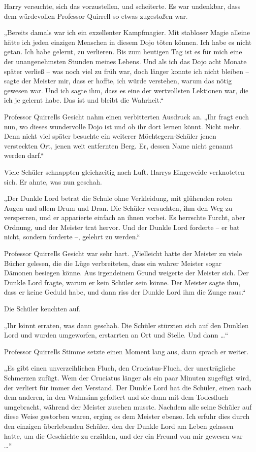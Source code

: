 {Harry versuchte, sich das vorzustellen, und scheiterte. Es war undenkbar, dass dem würdevollen Professor Quirrell so etwas zugestoßen war.

„Bereits damals war ich ein exzellenter Kampfmagier. Mit stabloser Magie alleine hätte ich jeden einzigen Menschen in diesem Dojo töten können. Ich habe es nicht getan. Ich habe gelernt, zu verlieren. Bis zum heutigen Tag ist es für mich eine der unangenehmsten Stunden meines Lebens. Und als ich das Dojo acht Monate später verließ -- was noch viel zu früh war, doch länger konnte ich nicht bleiben -- sagte der Meister mir, dass er hoffte, ich würde verstehen, warum das nötig gewesen war. Und ich sagte ihm, dass es eine der wertvollsten Lektionen war, die ich je gelernt habe. Das ist und bleibt die Wahrheit.“

Professor Quirrells Gesicht nahm einen verbitterten Ausdruck an. „Ihr fragt euch nun, wo dieses wundervolle Dojo ist und ob ihr dort lernen könnt. Nicht mehr. Denn nicht viel später besuchte ein weiterer Möchtegern-Schüler jenen versteckten Ort, jenen weit entfernten Berg. Er, dessen Name nicht genannt werden darf.“

Viele Schüler schnappten gleichzeitig nach Luft. Harrys Eingeweide verknoteten sich. Er ahnte, was nun geschah.

„Der Dunkle Lord betrat die Schule ohne Verkleidung, mit glühenden roten Augen und allem Drum und Dran. Die Schüler versuchten, ihm den Weg zu versperren, und er apparierte einfach an ihnen vorbei. Es herrschte Furcht, aber Ordnung, und der Meister trat hervor. Und der Dunkle Lord forderte -- er bat nicht, sondern forderte --, gelehrt zu werden.“

Professor Quirrells Gesicht war sehr hart. „Vielleicht hatte der Meister zu viele Bücher gelesen, die die Lüge verbreiteten, dass ein wahrer Meister sogar Dämonen besiegen könne. Aus irgendeinem Grund weigerte der Meister sich. Der Dunkle Lord fragte, warum er kein Schüler sein könne. Der Meister sagte ihm, dass er keine Geduld habe, und dann riss der Dunkle Lord ihm die Zunge raus.“

Die Schüler keuchten auf.

„Ihr könnt erraten, was dann geschah. Die Schüler stürzten sich auf den Dunklen Lord und wurden umgeworfen, erstarrten an Ort und Stelle. Und dann …“

Professor Quirrells Stimme setzte einen Moment lang aus, dann sprach er weiter.

„Es gibt einen unverzeihlichen Fluch, den Cruciatus-Fluch, der unerträgliche Schmerzen zufügt. Wem der Cruciatus länger als ein paar Minuten zugefügt wird, der verliert für immer den Verstand. Der Dunkle Lord hat die Schüler, einen nach dem anderen, in den Wahnsinn gefoltert und sie dann mit dem Todesfluch umgebracht, während der Meister zusehen musste. Nachdem alle seine Schüler auf diese Weise gestorben waren, erging es dem Meister ebenso. Ich erfuhr dies durch den einzigen überlebenden Schüler, den der Dunkle Lord am Leben gelassen hatte, um die Geschichte zu erzählen, und der ein Freund von mir gewesen war …“

}
